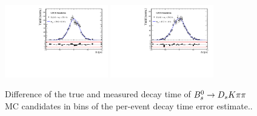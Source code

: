 \begin{figure}[h]
\includegraphics[height=!,width=0.4\textwidth]{figs/Resolution/SignalMC_bin_7.pdf}
\includegraphics[height=!,width=0.4\textwidth]{figs/Resolution/SignalMC_bin_8.pdf}
\caption{Difference of the true and measured decay time of ${{B}^0_{s}}\rightarrow{\ensuremath{{D}_{s}}}{\ensuremath{K}}{\ensuremath{\pi}}{\ensuremath{\pi}}$ MC candidates in bins of the per-event decay time error estimate..}
\label{fig:}
\end{figure}

\clearpage

